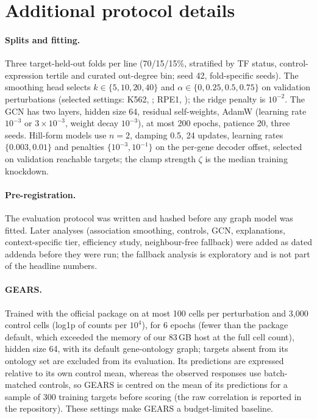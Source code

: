 \appendix
\section{Additional protocol details}
\label{app:protocol}
\paragraph{Splits and fitting.} Three target-held-out folds per line (70/15/15\%, stratified by TF status, control-expression tertile and curated out-degree bin; seed 42, fold-specific seeds). The smoothing head selects $k\in\{5,10,20,40\}$ and $\alpha\in\{0,0.25,0.5,0.75\}$ on validation perturbations (selected settings: K562, ; RPE1, ); the ridge penalty is $10^{-2}$. The GCN has two layers, hidden size 64, residual self-weights, AdamW (learning rate $10^{-3}$ or $3\times10^{-3}$, weight decay $10^{-3}$), at most 200 epochs, patience 20, three seeds. Hill-form models use $n=2$, damping 0.5, 24 updates, learning rates $\{0.003,0.01\}$ and penalties $\{10^{-3},10^{-1}\}$ on the per-gene decoder offset, selected on validation reachable targets; the clamp strength $\zeta$ is the median training knockdown.
\paragraph{Pre-registration.} The evaluation protocol was written and hashed before any graph model was fitted. Later analyses (association smoothing, controls, GCN, explanations, context-specific tier, efficiency study, neighbour-free fallback) were added as dated addenda before they were run; the fallback analysis is exploratory and is not part of the headline numbers.
\paragraph{GEARS.} Trained with the official package on at most 100 cells per perturbation and 3,000 control cells (log1p of counts per $10^4$), for 6 epochs (fewer than the package default, which exceeded the memory of our 83\,GB host at the full cell count), hidden size 64, with its default gene-ontology graph; targets absent from its ontology set are excluded from its evaluation. Its predictions are expressed relative to its own control mean, whereas the observed responses use batch-matched controls, so GEARS is centred on the mean of its predictions for a sample of 300 training targets before scoring (the raw correlation is reported in the repository). These settings make GEARS a budget-limited baseline.

